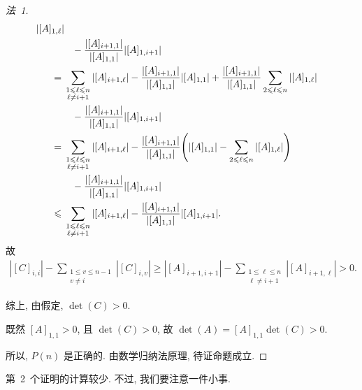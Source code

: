 \begin{proof}[法~1]
\begin{align*}
        {
        |[A]_{1,\ell}|
        }
        \\
        {}      &
        \hphantom{=}
        -
        \frac{|[A]_{i+1,1}|}{|[A]_{1,1}|}
        |[A]_{1,i+1}|
        \\
        = {}    &
        \sum_{\substack{1 \leq \ell \leq n \\ \ell \neq i+1}}
        {
        |[A]_{i+1,\ell}|
        }
        - \frac{|[A]_{i+1,1}|}{|[A]_{1,1}|} |[A]_{1,1}|
        +
        \frac{|[A]_{i+1,1}|}{|[A]_{1,1}|}
        \sum_{2 \leq \ell \leq n}
        {
        |[A]_{1,\ell}|
        }
        \\
        {}      &
        \hphantom{=}
        -
        \frac{|[A]_{i+1,1}|}{|[A]_{1,1}|}
        |[A]_{1,i+1}|
        \\
        = {}    &
        \sum_{\substack{1 \leq \ell \leq n \\ \ell \neq i+1}}
        {
        |[A]_{i+1,\ell}|
        }
        - \frac{|[A]_{i+1,1}|}{|[A]_{1,1}|}
        \Bigg(
        |[A]_{1,1}|
        -
        \sum_{2 \leq \ell \leq n}
        {
            |[A]_{1,\ell}|
        }
        \Bigg)
        \\
        {}      &
        \hphantom{=}
        -
        \frac{|[A]_{i+1,1}|}{|[A]_{1,1}|}
        |[A]_{1,i+1}|
        \\
        \leq {} &
        \sum_{\substack{1 \leq \ell \leq n \\ \ell \neq i+1}}
        {
        |[A]_{i+1,\ell}|
        }
        -
        \frac{|[A]_{i+1,1}|}{|[A]_{1,1}|}
        |[A]_{1,i+1}|.
    \end{align*}
    故
    \begin{align*}
        |[C]_{i,i}| -
        \sum_{\substack{1 \leq v \leq n-1  \\ v \neq i}}
        {|[C]_{i,v}|}
        \geq
        |[A]_{i+1,i+1}| -
        \sum_{\substack{1 \leq \ell \leq n \\ \ell \neq i+1}}
        {
        |[A]_{i+1,\ell}|
        }
        > 0.
    \end{align*}

    综上, 由假定, \(\det {(C)} > 0\).

    既然 \([A]_{1,1} > 0\),
    且 \(\det {(C)} > 0\),
    故 \(\det {(A)} = [A]_{1,1} \det {(C)} > 0\).

    所以, \(P(n)\) 是正确的.
    由数学归纳法原理, 待证命题成立.
\end{proof}

第~2~个证明的计算较少.
不过, 我们要注意一件小事.

